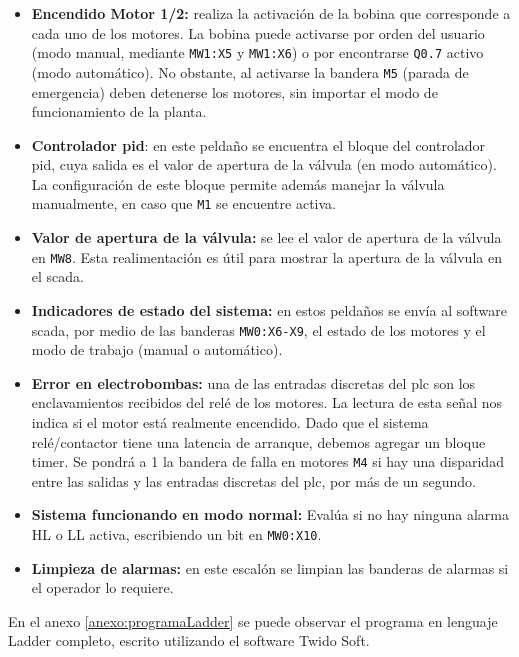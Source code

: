 \begin{itemize}
  \item \textbf{Encendido Motor 1/2:}
  realiza la activación de la bobina que corresponde a cada uno de los motores.
  La bobina puede activarse por orden del usuario (modo manual, mediante
\verb|MW1:X5| y \verb|MW1:X6|) o por
encontrarse \verb|Q0.7| activo (modo automático).
 No obstante, al activarse la bandera \verb|M5| (parada de emergencia) deben
detenerse
 los motores, sin importar el modo de funcionamiento de la planta.

  \item \textbf{Controlador \gls{pid}}: en este peldaño se encuentra el bloque
del controlador \gls{pid}, cuya salida es el valor de apertura de la
válvula (en modo automático).
  La configuración de este bloque permite además manejar la válvula
manualmente, en caso que \verb|M1| se encuentre activa.

  \item \textbf{Valor de apertura de la válvula:} se lee el valor de apertura de
la válvula en \verb|MW8|. Esta realimentación es útil para mostrar
la apertura de la válvula en el \gls{scada}.

  \item \textbf{Indicadores de estado del sistema:} en estos peldaños se envía
al software \gls{scada}, por medio de las banderas \verb|MW0:X6-X9|,
  el estado de los motores y el modo de trabajo (manual o automático).

  \item \textbf{Error en electrobombas:} una de las entradas discretas del
\gls{plc}
son los enclavamientos recibidos del relé de los motores. La lectura de esta
señal nos indica si el motor está realmente encendido.
  Dado que el sistema relé/contactor tiene una latencia de arranque, debemos
agregar un bloque timer.
Se pondrá a 1 la bandera de falla en motores \verb|M4| si hay
una disparidad entre las
salidas y las entradas discretas del \gls{plc}, por más de un segundo.

  \item \textbf{Sistema funcionando en modo normal:}
  Evalúa si no hay ninguna alarma HL o LL activa, escribiendo un bit en
\verb|MW0:X10|.

  \item \textbf{Limpieza de alarmas:} en este escalón se limpian las banderas
de alarmas si el operador lo requiere.
\end{itemize}

En el anexo \ref{anexo:programaLadder} se puede
observar el programa en
lenguaje Ladder completo, escrito utilizando el software Twido Soft.

